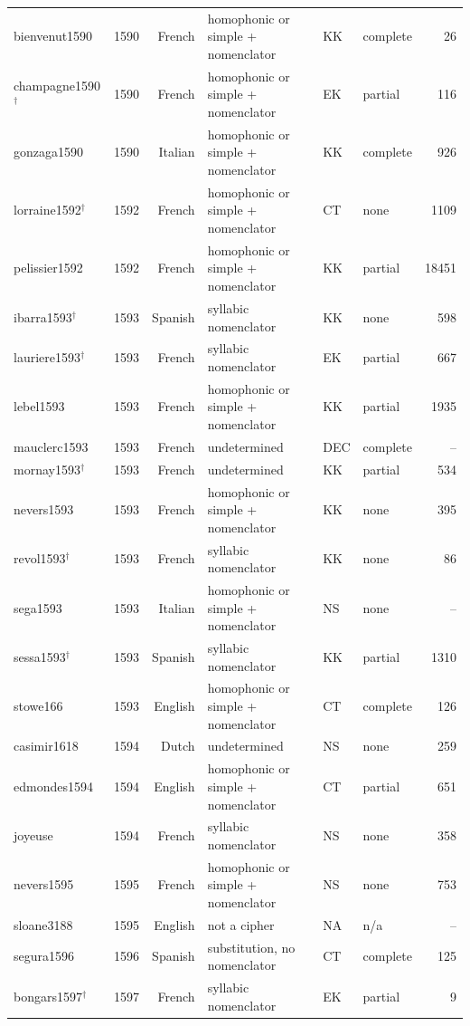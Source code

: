 {\begin{longtable}{@{}llrlllr@{}}
bienvenut1590 & 1590 & French & homophonic or simple + nomenclator & KK & complete & 26 \\
champagne1590$^\dagger$ & 1590 & French & homophonic or simple + nomenclator & EK & partial & 116 \\
gonzaga1590 & 1590 & Italian & homophonic or simple + nomenclator & KK & complete & 926 \\
lorraine1592$^\dagger$ & 1592 & French & homophonic or simple + nomenclator & CT & none & 1109 \\
pelissier1592 & 1592 & French & homophonic or simple + nomenclator & KK & partial & 18451 \\
ibarra1593$^\dagger$ & 1593 & Spanish & syllabic nomenclator & KK & none & 598 \\
lauriere1593$^\dagger$ & 1593 & French & syllabic nomenclator & EK & partial & 667 \\
lebel1593 & 1593 & French & homophonic or simple + nomenclator & KK & partial & 1935 \\
mauclerc1593 & 1593 & French & undetermined & DEC & complete & -- \\
mornay1593$^\dagger$ & 1593 & French & undetermined & KK & partial & 534 \\
nevers1593 & 1593 & French & homophonic or simple + nomenclator & KK & none & 395 \\
revol1593$^\dagger$ & 1593 & French & syllabic nomenclator & KK & none & 86 \\
sega1593 & 1593 & Italian & homophonic or simple + nomenclator & NS & none & -- \\
sessa1593$^\dagger$ & 1593 & Spanish & syllabic nomenclator & KK & partial & 1310 \\
stowe166 & 1593 & English & homophonic or simple + nomenclator & CT & complete & 126 \\
casimir1618 & 1594 & Dutch & undetermined & NS & none & 259 \\
edmondes1594 & 1594 & English & homophonic or simple + nomenclator & CT & partial & 651 \\
joyeuse & 1594 & French & syllabic nomenclator & NS & none & 358 \\
nevers1595 & 1595 & French & homophonic or simple + nomenclator & NS & none & 753 \\
sloane3188 & 1595 & English & not a cipher & NA & n/a & -- \\
segura1596 & 1596 & Spanish & substitution, no nomenclator & CT & complete & 125 \\
bongars1597$^\dagger$ & 1597 & French & syllabic nomenclator & EK & partial & 9 \\

\end{longtable}}
